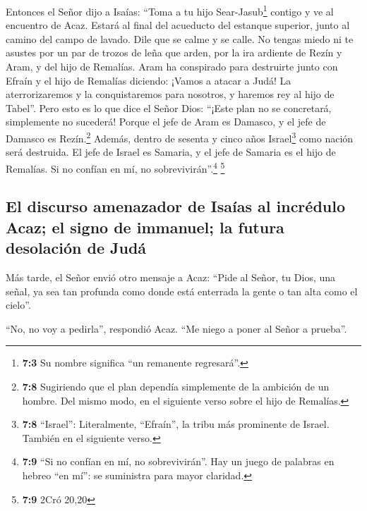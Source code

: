  Entonces el Señor dijo a Isaías: ``Toma a tu hijo
Sear-Jasub\footnote{\textbf{7:3} Su nombre significa ``un remanente
  regresará''.} contigo y ve al encuentro de Acaz. Estará al final del
acueducto del estanque superior, junto al camino del campo de lavado.
 Dile que se calme y se calle. No tengas miedo ni te
asustes por un par de trozos de leña que arden, por la ira ardiente de
Rezín y Aram, y del hijo de Remalías.  Aram ha conspirado
para destruirte junto con Efraín y el hijo de Remalías diciendo:
 ¡Vamos a atacar a Judá! La aterrorizaremos y la
conquistaremos para nosotros, y haremos rey al hijo de Tabel''.
 Pero esto es lo que dice el Señor Dios: ``¡Este plan no
se concretará, simplemente no sucederá!  Porque el jefe de
Aram es Damasco, y el jefe de Damasco es Rezín.\footnote{\textbf{7:8}
  Sugiriendo que el plan dependía simplemente de la ambición de un
  hombre. Del mismo modo, en el siguiente verso sobre el hijo de
  Remalías.} Además, dentro de sesenta y cinco años Israel\footnote{\textbf{7:8}
  ``Israel'': Literalmente, ``Efraín'', la tribu más prominente de
  Israel. También en el siguiente verso.} como nación será destruida.
 El jefe de Israel es Samaria, y el jefe de Samaria es el
hijo de Remalías. Si no confían en mí, no sobrevivirán''.\footnote{\textbf{7:9}
  ``Si no confían en mí, no sobrevivirán''. Hay un juego de palabras en
  hebreo ``en mí'': se suministra para mayor claridad.} \footnote{\textbf{7:9}
  2Cró 20,20}

\hypertarget{el-discurso-amenazador-de-isauxedas-al-incruxe9dulo-acaz-el-signo-de-immanuel-la-futura-desolaciuxf3n-de-juduxe1}{%
\subsection{El discurso amenazador de Isaías al incrédulo Acaz; el signo
de immanuel; la futura desolación de
Judá}\label{el-discurso-amenazador-de-isauxedas-al-incruxe9dulo-acaz-el-signo-de-immanuel-la-futura-desolaciuxf3n-de-juduxe1}}

 Más tarde, el Señor envió otro mensaje a Acaz:
 ``Pide al Señor, tu Dios, una señal, ya sea tan profunda
como donde está enterrada la gente o tan alta como el cielo''.

 ``No, no voy a pedirla'', respondió Acaz. ``Me niego a
poner al Señor a prueba''.

